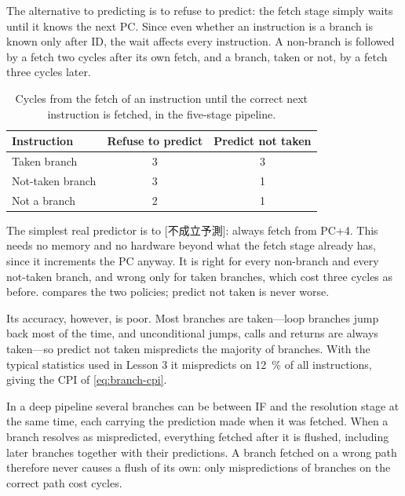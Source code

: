 \documentclass[../main.tex]{subfiles}
\begin{document}
The alternative to predicting is to refuse to predict: the fetch stage simply
waits until it knows the next PC.
Since even whether an instruction is a branch is known only after ID, the
wait affects every instruction.  A non-branch is followed by a fetch two
cycles after its own fetch, and a branch, taken or not, by a fetch three
cycles later.

\begin{table}[b]
  \centering\small
  \caption{Cycles from the fetch of an instruction until the correct next
    instruction is fetched, in the five-stage pipeline.}
  \label{tab:l04-not-taken}
  \begin{tabular}{@{}lcc@{}}
    \toprule
    Instruction        & Refuse to predict & Predict not taken \\
    \midrule
    Taken branch       & 3 & 3 \\
    Not-taken branch   & 3 & 1 \\
    Not a branch       & 2 & 1 \\
    \bottomrule
  \end{tabular}
\end{table}

The simplest real predictor is to [不成立予測]:
always fetch from PC+4.  This needs no memory and no hardware beyond what the
fetch stage already has, since it increments the PC anyway.  It is right for
every non-branch and every not-taken branch, and wrong only for taken
branches, which cost three cycles as before.  
compares the two policies; predict not taken is never worse.

Its accuracy, however, is poor.  Most branches are taken---loop branches
jump back most of the time, and unconditional jumps, calls and returns are
always taken---so predict not taken mispredicts the majority of branches.
With the typical statistics used in Lesson 3 it mispredicts on
\SI{12}{\percent} of all instructions, giving the CPI of \cref{eq:branch-cpi}.

\begin{note}
  In a deep pipeline several branches can be between IF and the resolution
  stage at the same time, each carrying the prediction made when it was
  fetched.  When a branch resolves as mispredicted, everything fetched after
  it is flushed, including later branches together with their predictions.
  A branch fetched on a wrong path therefore never causes a flush of its own:
  only mispredictions of branches on the correct path cost cycles.
\end{note}
\end{document}
